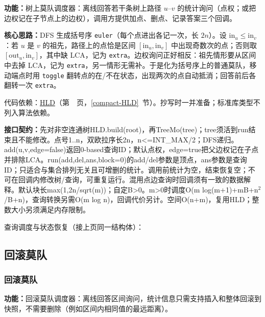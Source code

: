 \noindent\textbf{功能：}\allowbreak 树上莫队调度器：离线回答若干条树上路径 $u$–$v$ 的统计询问（点权；或把边权记在子节点上的边权），调用方提供加点、删点、记录答案三个回调。

\textbf{核心思路：}\allowbreak DFS 生成括号序 \texttt{euler}（每个点进出各记一次，长 $2n$）。设 $\mathrm{in}_u\le\mathrm{in}_v$：若 $u$ 是 $v$ 的祖先，路径上的点恰是区间 $[\mathrm{in}_u,\mathrm{in}_v]$ 中出现奇数次的点；否则取 $[\mathrm{out}_u,\mathrm{in}_v]$，其中缺 LCA，记为 \texttt{extra}。边权询问正好相反：祖先情形要从区间中去掉 LCA，记为 \texttt{extra}，另一情形无需补。于是化为括号序上的普通莫队，移动端点时用 \texttt{toggle} 翻转点的在/不在状态，出现两次的点自动抵消；回答前后各翻转一次 \texttt{extra}。

代码依赖：\hyperref[compact-HLD]{HLD}（第~\pageref{compact-HLD}~页，\ref{compact-HLD}~节）。抄写时一并准备；标准库类型不列入算法依赖。

{\sloppy{}\noindent\textbf{接口契约：}先对非空连通树HLD.build(root)，再TreeMo(tree)；tree须活到run结束且不能修改。点号1..n，双欧拉序长2n，n<=INT\_MAX/2；DFS递归。add(u,v,edge=false)返回0-based查询ID；默认点权，edge=true把父边权记在子点并排除LCA。run(add,del,ans,block=0)的add/del参数是顶点，ans参数是查询ID；只适合与集合排列无关且可增删的统计。调用前统计为空，结束恢复空；不可在回调内修改树/查询，可重复运行。混用点边查询时回调须有一致的数据解释。默认块长max(1,2n/sqrt(m))；自定B>0。m>0时调度O(m log(m+1)+mB+n$^{2}$/B+n)，查询转换另需O(m log n)，回调代价另计。空间O(n+m)，复用HLD；整数大小另须满足内存限制。\par}



\newpage

\noindent 查询调度与状态恢复（接上页同一结构体）：



\Needspace{180pt}

\subsection{回滚莫队}

\subsubsection{回滚莫队}\label{compact-RollbackMo}

\noindent\textbf{功能：}\allowbreak 回滚莫队调度器：离线回答区间询问，统计信息只需支持插入和整体回滚到快照，不需要删除（例如区间内相同值的最远距离）。

